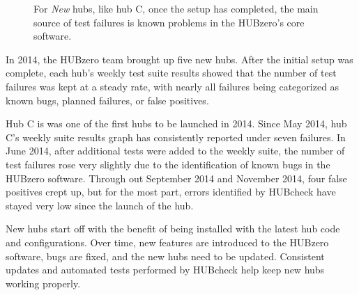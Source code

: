 \begin{figure}[ht!]
\begin{subfigure}[b]{0.65\textwidth}
        \end{subfigure}
        \caption{For \textit{New} hubs, like hub C, once the setup has completed,
                 the main source of test failures is known problems
                 in the HUBzero's core software.}
        \label{fig:hub_c_health_plots}
\end{figure}


In 2014, the HUBzero team brought up five new hubs.  After the initial setup
was complete, each hub's weekly test suite results showed that the number of
test failures was kept at a steady rate, with nearly all failures being
categorized as known bugs, planned failures, or false positives.

Hub C is was one of the first hubs to be launched in 2014. Since May 2014, hub
C's weekly suite results graph has consistently reported under seven failures.
In June 2014, after additional tests were added to the weekly suite, the number
of test failures rose very slightly due to the identification of known bugs in
the HUBzero software.  Through out September 2014 and November 2014, four false
positives crept up, but for the most part, errors identified by HUBcheck have
stayed very low since the launch of the hub.

New hubs start off with the benefit of being installed with the latest hub code
and configurations. Over time, new features are introduced to the HUBzero
software, bugs are fixed, and the new hubs need to be updated. Consistent
updates and automated tests performed by HUBcheck help keep new hubs working
properly.
